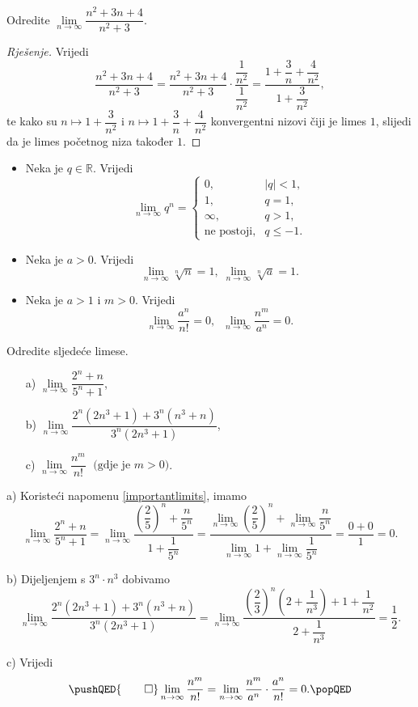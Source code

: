 \begin{exercise}
Odredite $\lim\limits_{n\to \infty}{\dfrac{n^2+3n+4}{n^2+3}}$.
\end{exercise}
\begin{proof}[Rješenje]
Vrijedi
$$\dfrac{n^2+3n+4}{n^2+3}=\dfrac{n^2+3n+4}{n^2+3}\cdot \dfrac{\dfrac{1}{n^2}}{\dfrac{1}{n^2}}=\dfrac{1+\dfrac{3}{n}+\dfrac{4}{n^2}}{1+\dfrac{3}{n^2}},$$
te kako su $n\mapsto 1+\dfrac{3}{n^2}$ i $n\mapsto 1+\dfrac{3}{n}+\dfrac{4}{n^2}$ konvergentni nizovi čiji je limes $1$, slijedi da je limes početnog niza također $1$.
\end{proof}
\newpage
\begin{remark} \textbf{}
\label{importantlimits}
\begin{itemize}
\item Neka je $q\in \mathbb{R}$. Vrijedi
$$\lim\limits_{n\to \infty}{q^n}=\begin{cases}
0, & |q|<1,\\
1, & q=1,\\
\infty, & q>1,\\
\text{ne postoji}, & q\leq -1.
\end{cases}$$
\item Neka je $a>0$. Vrijedi
$$\lim\limits_{n\to \infty}{\sqrt[n]{n}}=1,\;\lim\limits_{n\to \infty}{\sqrt[n]{a}}=1.$$
\item Neka je $a>1$ i $m>0$. Vrijedi
$$\lim\limits_{n\to \infty}{\dfrac{a^n}{n!}}=0,\;\; \lim\limits_{n\to \infty}{\dfrac{n^m}{a^n}}=0.$$
\end{itemize}
\end{remark}
\begin{exercise} Odredite sljedeće limese.
\begin{itemize}
\item[a)] $\lim\limits_{n\to \infty}{\dfrac{2^n+n}{5^n+1}}$,
\item[b)] $\lim\limits_{n\to \infty}{\dfrac{2^n(2n^3+1)+3^n(n^3+n)}{3^n(2n^3+1)}}$,
\item[c)] $\lim\limits_{n\to \infty}{\dfrac{n^m}{n!}}\;\text{ (gdje je } m>0\text{)}$.
\end{itemize}
\end{exercise}
\begin{proof*}
a) Koristeći napomenu \ref{importantlimits}, imamo
$$\lim\limits_{n\to \infty}{\dfrac{2^n+n}{5^n+1}}=\lim\limits_{n\to \infty}{\dfrac{\left(\dfrac{2}{5}\right)^n+\dfrac{n}{5^n}}{1+\dfrac{1}{5^n}}}=\dfrac{\lim\limits_{n\to \infty}{\left(\dfrac{2}{5}\right)^n}+\lim\limits_{n\to \infty}{\dfrac{n}{5^n}}}{\lim\limits_{n\to \infty}{1}+\lim\limits_{n\to \infty}{\dfrac{1}{5^n}}}=\dfrac{0+0}{1}=0.$$

b) Dijeljenjem s $3^n\cdot n^3$ dobivamo
$$\lim\limits_{n\to \infty}{\dfrac{2^n(2n^3+1)+3^n(n^3+n)}{3^n(2n^3+1)}}=\lim\limits_{n\to \infty}{\dfrac{\left(\dfrac{2}{3}\right)^n\left(2 + \dfrac{1}{n^{3}}\right)+1 + \dfrac{1}{n^{2}}}{2 + \dfrac{1}{n^{3}}}}=\dfrac{1}{2}.$$

c) Vrijedi
\[
\pushQED{\qed}
\lim\limits_{n\to \infty}{\dfrac{n^m}{n!}}=\lim\limits_{n\to \infty}{\dfrac{n^m}{a^n}\cdot \dfrac{a^n}{n!}}=0.\qedhere
\popQED
\]
\end{proof*}
